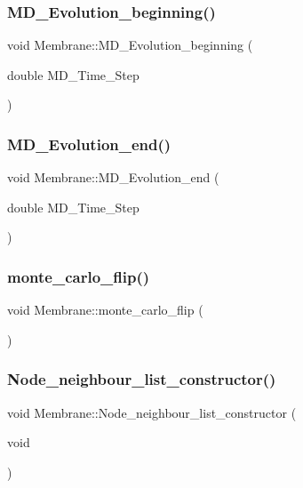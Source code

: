 \subsubsection{\texorpdfstring{MD\_Evolution\_beginning()}{MD\_Evolution\_beginning()}}
{\footnotesize\ttfamily void Membrane\+::\+M\+D\+\_\+\+Evolution\+\_\+beginning (\begin{DoxyParamCaption}\item[{double}]{M\+D\+\_\+\+Time\+\_\+\+Step }\end{DoxyParamCaption})}

\mbox{\label{classMembrane_a5292913dd4500db14e26147920a21e58}} 
\subsubsection{\texorpdfstring{MD\_Evolution\_end()}{MD\_Evolution\_end()}}
{\footnotesize\ttfamily void Membrane\+::\+M\+D\+\_\+\+Evolution\+\_\+end (\begin{DoxyParamCaption}\item[{double}]{M\+D\+\_\+\+Time\+\_\+\+Step }\end{DoxyParamCaption})}

\mbox{\label{classMembrane_aaa46e2de4dee21902fc75e775844230d}} 
\subsubsection{\texorpdfstring{monte\_carlo\_flip()}{monte\_carlo\_flip()}}
{\footnotesize\ttfamily void Membrane\+::monte\+\_\+carlo\+\_\+flip (\begin{DoxyParamCaption}{ }\end{DoxyParamCaption})}

\mbox{\label{classMembrane_aca9785ad0ab2514006a46c0c9bd8cf5c}} 
\subsubsection{\texorpdfstring{Node\_neighbour\_list\_constructor()}{Node\_neighbour\_list\_constructor()}}
{\footnotesize\ttfamily void Membrane\+::\+Node\+\_\+neighbour\+\_\+list\+\_\+constructor (\begin{DoxyParamCaption}\item[{void}]{ }\end{DoxyParamCaption})}


